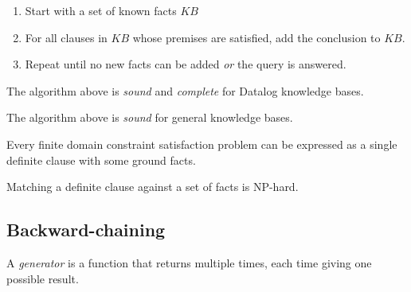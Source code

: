 \documentclass{article}
\begin{document}
\begin{enumerate}
    \item Start with a set of known facts $KB$
    \item For all clauses in $KB$ whose premises are satisfied, add the conclusion to $KB$.
    \item Repeat until no new facts can be added \emph{or} the query is answered.
\end{enumerate}

\begin{theorem}
    The algorithm above is \emph{sound} and \emph{complete} for Datalog knowledge bases.
\end{theorem}

\begin{theorem}
    The algorithm above is \emph{sound} for general knowledge bases.
\end{theorem}

\begin{theorem}
    Every finite domain constraint satisfaction problem can be expressed as a 
    single definite clause with some ground facts.
\end{theorem}

\begin{theorem}
    Matching a definite clause against a set of facts is NP-hard.
\end{theorem}

\subsection{Backward-chaining}

\begin{definition}
    A \emph{generator} is a function that returns multiple times, each time giving one
    possible result.
\end{definition}
\end{document}
